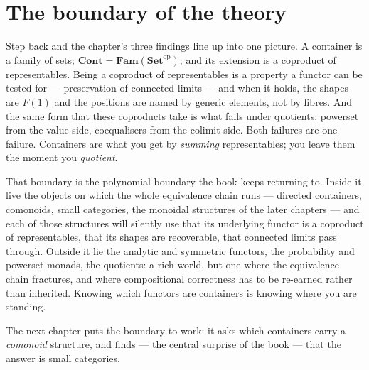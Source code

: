 \documentclass[11pt]{article}
\theoremstyle{plain}
\theoremstyle{definition}
\newcommand{\Set}{\mathbf{Set}}
\newcommand{\Cont}{\mathbf{Cont}}
\newcommand{\Fam}{\mathbf{Fam}}
\newcommand{\op}{^{\mathrm{op}}}
\begin{document}
\section{The boundary of the theory}
\label{sec:boundary}

Step back and the chapter's three findings line up into one picture. A container is a
family of sets; $\Cont=\Fam(\Set\op)$; and its extension is a coproduct of
representables. Being a coproduct of representables is a property a functor can be
tested for --- preservation of connected limits --- and when it holds, the shapes are
$F(1)$ and the positions are named by generic elements, not by fibres. And the same
form that these coproducts take is what fails under quotients: powerset from the value
side, coequalisers from the colimit side. Both failures are one failure. Containers are
what you get by \emph{summing} representables; you leave them the moment you
\emph{quotient}.

That boundary is the polynomial boundary the book keeps returning to. Inside it live
the objects on which the whole equivalence chain runs --- directed containers,
comonoids, small categories, the monoidal structures of the later chapters --- and each
of those structures will silently use that its underlying functor is a coproduct of
representables, that its shapes are recoverable, that connected limits pass through.
Outside it lie the analytic and symmetric functors, the probability and powerset
monads, the quotients: a rich world, but one where the equivalence chain fractures,
and where compositional correctness has to be re-earned rather than inherited. Knowing
which functors are containers is knowing where you are standing.

The next chapter puts the boundary to work: it asks which containers carry a
\emph{comonoid} structure, and finds --- the central surprise of the book --- that the
answer is small categories.
\end{document}
